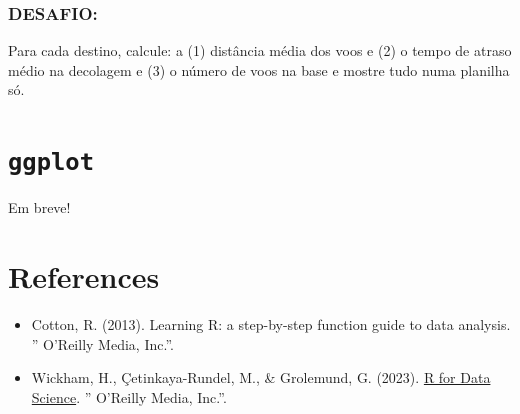 \documentclass[
]{book}
\begin{document}
\subsection{DESAFIO:}\label{desafio}

Para cada destino, calcule: a (1) distância média dos voos e (2) o tempo de atraso médio na decolagem e (3) o número de voos na base e mostre tudo numa planilha só.

\chapter{\texorpdfstring{\texttt{ggplot}}{ggplot}}\label{ggplot}

Em breve!

\chapter*{References}\label{references}

\begin{itemize}
\item
  Cotton, R. (2013). Learning R: a step-by-step function guide to data analysis. '' O'Reilly Media, Inc.''.
\item
  Wickham, H., Çetinkaya-Rundel, M., \& Grolemund, G. (2023). \href{https://r4ds.had.co.nz/}{R for Data Science}. '' O'Reilly Media, Inc.''.
\end{itemize}

  
\end{document}
